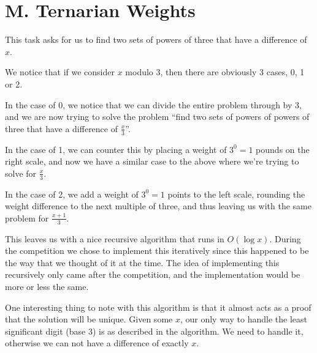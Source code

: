 \section*{M. Ternarian Weights}

This task asks for us to find two sets of powers of three that have a difference of $x$.

We notice that if we consider $x$ modulo 3, then there are obviously 3 cases,
0, 1 or 2.

In the case of 0, we notice that we can divide the entire problem through by 3,
and we are now trying to solve the problem ``find two sets of powers of powers
of three that have a difference of $\frac x 3$''.

In the case of 1, we can counter this by placing a weight of $3^0 = 1$ pounds
on the right scale, and now we have a similar case to the above where we're
trying to solve for $\frac x 3$.

In the case of 2, we add a weight of $3^0 = 1$ points to the left scale,
rounding the weight difference to the next multiple of three, and thus leaving
us with the same problem for $\frac {x + 1} 3$.

This leaves us with a nice recursive algorithm that runs in $O(\log x)$. During
the competition we chose to implement this iteratively since this happened to
be the way that we thought of it at the time. The idea of implementing this
recursively only came after the competition, and the implementation would be
more or less the same.

One interesting thing to note with this algorithm is that it almost acts as a
proof that the solution will be unique. Given some $x$, our only way to handle
the least significant digit (base 3) is as described in the algorithm. We need
to handle it, otherwise we can not have a difference of exactly $x$.
